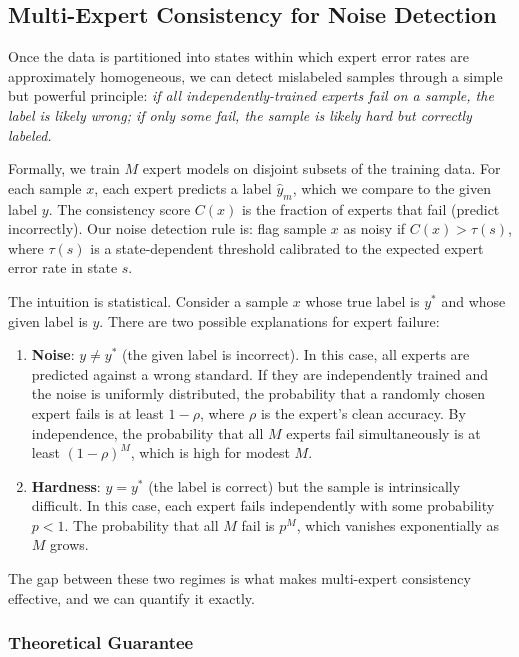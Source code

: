 \subsection{Multi-Expert Consistency for Noise Detection}
\label{sec:consistency}

Once the data is partitioned into states within which expert error rates are approximately homogeneous, we can detect mislabeled samples through a simple but powerful principle: \emph{if all independently-trained experts fail on a sample, the label is likely wrong; if only some fail, the sample is likely hard but correctly labeled.}

Formally, we train $M$ expert models on disjoint subsets of the training data. For each sample $x$, each expert predicts a label $\hat{y}_m$, which we compare to the given label $y$. The consistency score $C(x)$ is the fraction of experts that fail (predict incorrectly). Our noise detection rule is: flag sample $x$ as noisy if $C(x) > \tau(s)$, where $\tau(s)$ is a state-dependent threshold calibrated to the expected expert error rate in state $s$.

The intuition is statistical. Consider a sample $x$ whose true label is $y^*$ and whose given label is $y$. There are two possible explanations for expert failure:

\begin{enumerate}
    \item \textbf{Noise}: $y \neq y^*$ (the given label is incorrect). In this case, all experts are predicted against a wrong standard. If they are independently trained and the noise is uniformly distributed, the probability that a randomly chosen expert fails is at least $1 - \rho$, where $\rho$ is the expert's clean accuracy. By independence, the probability that all $M$ experts fail simultaneously is at least $(1 - \rho)^M$, which is high for modest $M$.
    \item \textbf{Hardness}: $y = y^*$ (the label is correct) but the sample is intrinsically difficult. In this case, each expert fails independently with some probability $p < 1$. The probability that all $M$ fail is $p^M$, which vanishes exponentially as $M$ grows.
\end{enumerate}

The gap between these two regimes is what makes multi-expert consistency effective, and we can quantify it exactly.

\subsubsection{Theoretical Guarantee}

